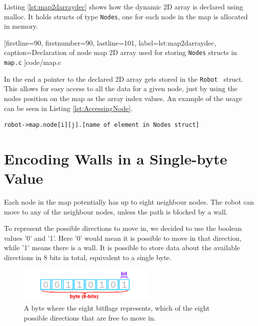 Listing \ref{lst:map2darraydec} shows how the dynamic 2D array is declared using malloc. 
It holds structs of type {\tt Nodes}, one for each node in the map is allocated in memory.


[firstline=90,			%
firstnumber=90,		%
lastline=101,			%
label=lst:map2darraydec,	%
caption={Declaration of node map 2D array used for storing {\tt Nodes} structs in {\tt map.c}}
]{code/map.c}

In the end a pointer to the declared 2D array gets stored in the {\tt Robot } struct.
This allows for easy access to all the data for a given node, just by using the nodes position on the map as the array index values. An example of the usage can be seen in Listing \ref{lst:AccessingNode}. 

\begin{lstlisting}[caption={Example of accessing a node in the node map stored in a 2D array in {\tt map.c}},label={lst:AccessingNode}]
robot->map.node[i][j].[name of element in Nodes struct]
\end{lstlisting}

\section{Encoding Walls in a Single-byte Value}
\label{sec:map_hex}
Each node in the map potentially has up to eight neighbour nodes. 
The robot can move to any of the neighbour nodes, unless the path is blocked by a wall.

To represent the possible directions to move in, we decided to use the boolean values '0' and '1'. 
Here '0' would mean it is possible to move in that direction, while '1' means there is a wall.
It is possible to store data about the available directions in 8 bits in total, equivalent to a single byte.

\begin{figure}[htp]
    \centering
        \includegraphics[width=0.60\textwidth]{figures/map/bitbyte.png}%
    \caption{A byte where the eight bitflags represents, which of the eight possible directions that are free to move in.}
    \label{fig:bitbyte}
\end{figure}


